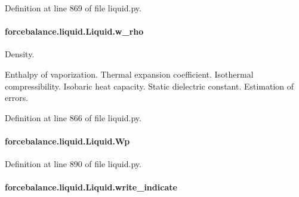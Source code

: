 Definition at line 869 of file liquid.\-py.

\hypertarget{classforcebalance_1_1liquid_1_1Liquid_aef8ad1dda086bde6f48130d273af9784}{
\paragraph[{w\-\_\-rho}]{\setlength{\rightskip}{0pt plus 5cm}forcebalance.\-liquid.\-Liquid.\-w\-\_\-rho\hspace{0.3cm}{\ttfamily [inherited]}}}\label{classforcebalance_1_1liquid_1_1Liquid_aef8ad1dda086bde6f48130d273af9784}


Density. 

Enthalpy of vaporization. Thermal expansion coefficient. Isothermal compressibility. Isobaric heat capacity. Static dielectric constant. Estimation of errors. 

Definition at line 866 of file liquid.\-py.

\hypertarget{classforcebalance_1_1liquid_1_1Liquid_a34fc96849307fd94c2cb41705ad4445c}{
\paragraph[{Wp}]{\setlength{\rightskip}{0pt plus 5cm}forcebalance.\-liquid.\-Liquid.\-Wp\hspace{0.3cm}{\ttfamily [inherited]}}}\label{classforcebalance_1_1liquid_1_1Liquid_a34fc96849307fd94c2cb41705ad4445c}


Definition at line 890 of file liquid.\-py.

\hypertarget{classforcebalance_1_1liquid_1_1Liquid_a2ef5b56bb5efbc942535ee406d514610}{
\paragraph[{write\-\_\-indicate}]{\setlength{\rightskip}{0pt plus 5cm}forcebalance.\-liquid.\-Liquid.\-write\-\_\-indicate\hspace{0.3cm}{\ttfamily [inherited]}}}\label{classforcebalance_1_1liquid_1_1Liquid_a2ef5b56bb5efbc942535ee406d514610}


